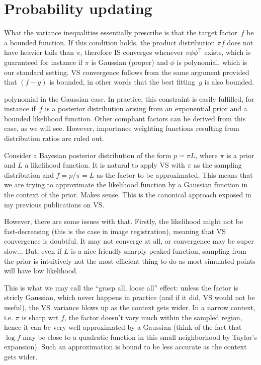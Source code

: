 \documentclass{article}
\begin{document}
\section{Probability updating}

What the variance inequalities essentially prescribe is that the target factor~$f$ be a bounded function. If this condition holds, the product distribution $\pi f$ does not have heavier tails than $\pi$, therefore IS converges whenever $\pi \phi\phi^\top$ exists, which is guaranteed for instance if $\pi$ is Gaussian (proper) and  $\phi$ is polynomial, which is our standard setting. VS convergence follows from the same argument provided that $(f-g)$ is bounded, in other words that the best fitting~$g$ is also bounded. 

polynomial in the Gaussian case. In practice, this constraint is easily fulfilled, for instance if~$f$ is a posterior distribution arising from an exponential prior and a bounded likelihood function. Other compliant factors can be derived from this case, as we will see. However, importance weighting functions resulting from distribution ratios are ruled out.

Consider a Bayesian posterior distribution of the form $p=\pi L$, where $\pi$ is a prior and $L$ a likelihood function. It is natural to apply VS with $\pi$ as the sampling distribution and $f=p/\pi=L$ as the factor to be approximated. This means that we are trying to approximate the likelihood function by a Gaussian function in the context of the prior. Makes sense. This is the canonical approach exposed in my previous publications on VS.

However, there are some issues with that. Firstly, the likelihood might not be fast-decreasing (this is the case in image registration), meaning that VS convergence is doubtful. It may not converge at all, or convergence may be super slow... But, even if $L$ is a nice friendly sharply peaked function, sampling from the prior is intuitively not the most efficient thing to do as most simulated points will have low likelihood.

This is what we may call the ``grasp all, loose all'' effect: unless the factor is stricly Gaussian, which never happens in practice (and if it did, VS would not be useful), the VS~variance blows up as the context gets wider. In a narrow context, i.e. $\pi$ is sharp wrt $f$, the factor doesn't vary much within the sampled region, hence it can be very well approximated by a Gaussian (think of the fact that $\log f$ may be close to a quadratic function in this small neighborhood by Taylor's expansion). Such an approximation is bound to be less accurate as the context gets wider. 
\end{document}
